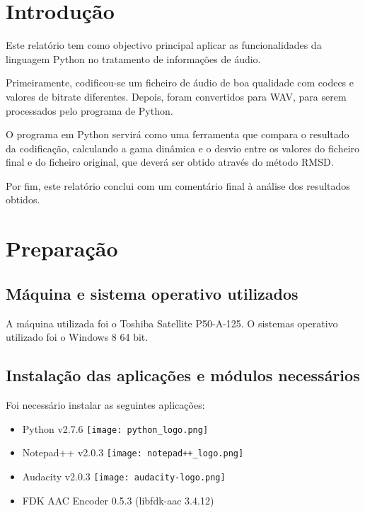 \documentclass[a4paper]{report}
\begin{document}
\chapter{Introdução}
\label{introducao}

Este relatório tem como objectivo principal aplicar as funcionalidades da linguagem Python no tratamento de informações de áudio.

Primeiramente, codificou-se um ficheiro de áudio de boa qualidade com codecs e valores de \gls{bitrate} diferentes. Depois, foram convertidos para \gls{WAV}, para serem processados pelo programa de Python.

O programa em Python servirá como uma ferramenta que compara o resultado da codificação, calculando a gama dinâmica e o desvio entre os valores do ficheiro final e do ficheiro original, que deverá ser obtido através do método \gls{RMSD}.

Por fim, este relatório conclui com um comentário final à análise dos resultados obtidos.

\chapter{Preparação}
\label{preparacao}

\section{Máquina e sistema operativo utilizados}
\label{machines}

A máquina utilizada foi o Toshiba Satellite P50-A-125.
O sistemas operativo utilizado foi o Windows 8 64 bit.

\section{Instalação das aplicações e módulos necessários}
\label{instalaraplicacoes}

Foi necessário instalar as seguintes aplicações: 
\begin{itemize}
\item {Python} v2.7.6 \cite{Python} \texttt{[image: python\_logo.png]}
\item {Notepad++} v2.0.3\cite{Notepad++} \texttt{[image: notepad++\_logo.png]}
\item {Audacity} v2.0.3\cite{Audacity} \texttt{[image: audacity-logo.png]}
\item {FDK AAC Encoder 0.5.3\cite{FDKACCEncoder} (libfdk-aac 3.4.12)}
\end{itemize}
\end{document}
